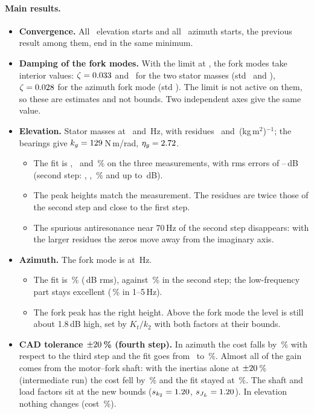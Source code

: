 \documentclass[10pt,a4paper]{article}
\numberwithin{equation}{section}
\begin{document}
\paragraph{Main results.}
\begin{itemize}
\item \textbf{Convergence.} All \nStartsP\ elevation starts and all \nStartsA\ azimuth starts, the previous result among them, end in the same minimum.
\item \textbf{Damping of the fork modes.} With the limit at \zetaMax, the fork modes take interior values: $\zeta=0.033$ and \zMassII\ for the two stator masses (std \zStdI\ and \zStdII), $\zeta=0.028$ for the azimuth fork mode (std \zForkStd). The limit is not active on them, so these are estimates and not bounds. Two independent axes give the same value.
\item \textbf{Elevation.} Stator masses at \fMassI\ and \fMassII\,Hz, with residues \aMassI\ and \aMassII\,(kg\,m$^2$)$^{-1}$; the bearings give $k_g=129$\,N\,m/rad, $\eta_g=2.72$.
  \begin{itemize}
  \item The fit is \fitPI, \fitPII\ and \fitPIII\,\% on the three measurements, with rms errors of \dbPIII--\dbPI\,dB (second step: \fitPIStep, \fitPIIStep, \fitPIIIStep\,\% and up to \dbPIIIStep\,dB).
  \item The peak heights match the measurement. The residues are twice those of the second step and close to the first step.
  \item The spurious antiresonance near 70\,Hz of the second step disappears: with the larger residues the zeros move away from the imaginary axis.
  \end{itemize}
\item \textbf{Azimuth.} The fork mode is at \fForkA\,Hz.
  \begin{itemize}
  \item The fit is \fitA\,\% (\dbA\,dB rms), against \fitAStep\,\% in the second step; the low-frequency part stays excellent (\fitLowA\,\% in 1--5\,Hz).
  \item The fork peak has the right height. Above the fork mode the level is still about 1.8\,dB high, set by $K_t/k_2$ with both factors at their bounds.
  \end{itemize}
\item \textbf{CAD tolerance $\pm20$\,\% (fourth step).} In azimuth the cost falls by \costRedA\,\% with respect to the third step and the fit goes from \fitAStepJ\ to \fitAFour\,\%. Almost all of the gain comes from the motor--fork shaft: with the inertias alone at $\pm20$\,\% (intermediate run) the cost fell by \costRedAInter\,\% and the fit stayed at \fitAInter\,\%. The shaft and load factors sit at the new bounds ($s_{k_2}=1.20$, $s_{J_L}=1.20$). In elevation nothing changes (cost \costRedP\,\%).

\end{itemize}
\end{document}

